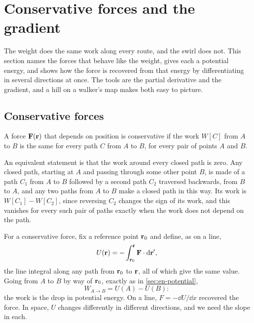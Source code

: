 \section{Conservative forces and the gradient}
\label{sec:en-gradient}

The weight does the same work along every route, and the swirl does not.
This section names the forces that behave like the weight, gives each a
potential energy, and shows how the force is recovered from that energy
by differentiating in several directions at once. The tools are the
partial derivative and the gradient, and a hill on a walker's map makes
both easy to picture.

\subsection*{Conservative forces}

\begin{definition}
A force $\bm{\mathrm{F}}(\bm{\mathrm{r}})$ that depends on position is conservative if the
work $W[C]$ from $A$ to $B$ is the same for every path $C$ from $A$ to
$B$, for every pair of points $A$ and $B$.
\end{definition}

An equivalent statement is that the work around every closed path is
zero. Any closed path, starting at $A$ and passing through some other
point $B$, is made of a path $C_1$ from $A$ to $B$ followed by a second
path $C_2$ traversed backwards, from $B$ to $A$, and any two paths from $A$
to $B$ make a closed path in this way. Its work is $W[C_1] - W[C_2]$, since reversing $C_2$ changes the
sign of its work, and this vanishes for every such pair of paths exactly
when the work does not depend on the path.

For a conservative force, fix a reference point $\bm{\mathrm{r}}_0$ and define,
as on a line,
\begin{equation}
   U(\bm{\mathrm{r}}) = -\int_{\bm{\mathrm{r}}_0}^{\bm{\mathrm{r}}}\bm{\mathrm{F}}\cdot\mathrm{d}\bm{\mathrm{r}}' ,
   \label{eq:en-potential-3d}
\end{equation}
the line integral along any path from $\bm{\mathrm{r}}_0$ to $\bm{\mathrm{r}}$, all of which
give the same value. Going from $A$ to $B$ by way of $\bm{\mathrm{r}}_0$, exactly
as in \cref{sec:en-potential},
\begin{equation*}
   W_{A\to B} = U(A) - U(B) :
\end{equation*}
the work is the drop in potential energy. On a line, $F = -\dd U/\dd x$
recovered the force. In space, $U$ changes differently in different
directions, and we need the slope in each.

